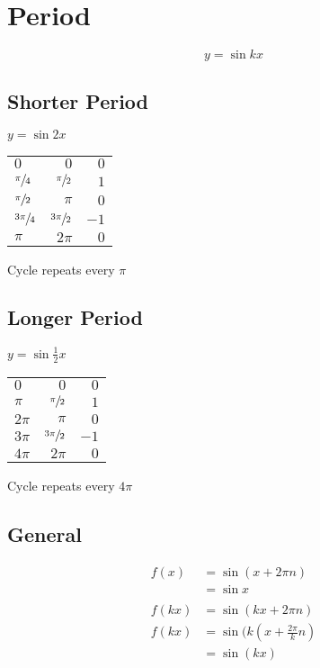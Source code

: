 \documentclass{exam}
\begin{document}
  \section{Period}
  \[
    y = \sin kx
  \]

  \subsection{Shorter Period}
  $y = \sin 2x$

  \begin{tabular}[H]{lrr}
    $0$                & $0$                & $0$ \\
    $\sfrac{\pi}{4}$   & $\sfrac{\pi}{2}$   & $1$ \\
    $\sfrac{\pi}{2}$   & $\pi$              & $0$ \\
    $\sfrac{3 \pi}{4}$ & $\sfrac{3 \pi}{2}$ & $-1$ \\
    $\pi$              & $2 \pi$            & $0$ \\
  \end{tabular}

  Cycle repeats every $\pi$

  \subsection{Longer Period}
  $y = \sin \frac{1}{2} x$

  \begin{tabular}[H]{lrr}
    $0$     & $0$                & $0$ \\
    $\pi$   & $\sfrac{\pi}{2}$   & $1$ \\
    $2 \pi$ & $\pi$              & $0$ \\
    $3\pi$  & $\sfrac{3 \pi}{2}$ & $-1$ \\
    $4 \pi$ & $2 \pi$            & $0$ \\
  \end{tabular}

  Cycle repeats every $4 \pi$

  \subsection{General}
  \begin{align*}
    f(x)  & = \sin(x + 2 \pi n) \\
          & = \sin x \\
    \\
    f(kx) & = \sin(kx + 2 \pi n) \\
    f(kx) & = \sin(k (x + \frac{2 \pi}{k} n) \\
          & = \sin(kx) \\
  \end{align*}
\end{document}
